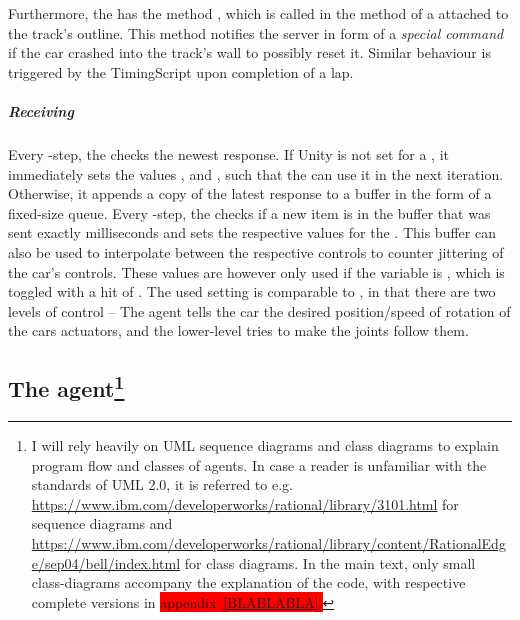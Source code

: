 Furthermore, the  has the method , which is called in the method  of a  attached to the track's outline. This method notifies the server in form of a \textit{special command} if the car crashed into the track's wall to possibly reset it. Similar behaviour is triggered by the TimingScript upon completion of a lap.

\subparagraph{Receiving}
Every -step, the  checks the newest response. If Unity is not set for a , it immediately sets the values ,  and , such that the  can use it in the next iteration. Otherwise, it appends a copy of the latest response to a buffer in the form of a fixed-size queue. Every -step, the  checks if a new item is in the buffer that was sent exactly  milliseconds and sets the respective values for the . This buffer can also be used to interpolate between the respective controls to counter jittering of the car's controls. These values are however only used if the variable  is , which is toggled with a hit of . The used setting is comparable to \cite{wawrzynski_control_2015}, in that there are two levels of control -- The agent tells the car the desired position/speed of rotation of the cars actuators, and the lower-level tries to make the joints follow them.





\subsection{The agent\footnote{I will rely heavily on UML sequence diagrams and class diagrams to explain program flow and classes of agents. In case a reader is unfamiliar with the standards of UML 2.0, it is referred to e.g. \url{https://www.ibm.com/developerworks/rational/library/3101.html} for sequence diagrams and \url{https://www.ibm.com/developerworks/rational/library/content/RationalEdge/sep04/bell/index.html} for class diagrams. In the main text, only small class-diagrams accompany the explanation of the code, with respective complete versions in  \colorbox{red}{appendix~\ref{BLABLABLA}.}}}

